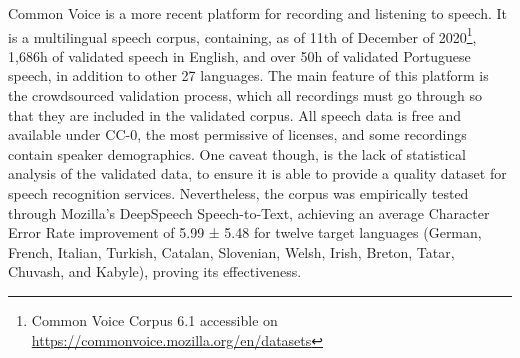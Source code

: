 Common Voice \cite{ardila2019common} is a more recent platform for recording and listening to speech. It is a multilingual speech corpus, containing, as of 11th of December of 2020\footnote{Common Voice Corpus 6.1 accessible on  \url{https://commonvoice.mozilla.org/en/datasets}}, 1,686h of validated speech in English, and over 50h of validated Portuguese speech, in addition to other 27 languages. The main feature of this platform is the crowdsourced validation process, which all recordings must go through so that they are included in the validated corpus. All speech data is free and available under CC-0, the most permissive of licenses, and some recordings contain speaker demographics. One caveat though, is the lack of statistical analysis of the validated data, to ensure it is able to provide a quality dataset for speech recognition services. Nevertheless, the corpus was empirically tested through Mozilla’s DeepSpeech Speech-to-Text, achieving an average Character Error Rate improvement of 5.99 ± 5.48 for twelve target languages (German, French, Italian, Turkish, Catalan, Slovenian, Welsh, Irish, Breton, Tatar, Chuvash, and Kabyle), proving its effectiveness.
